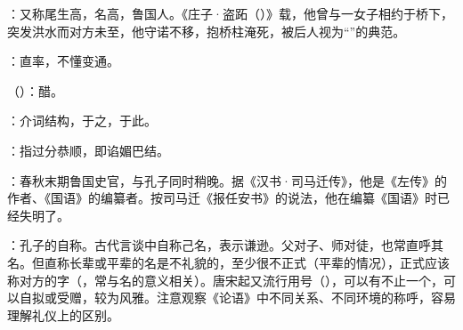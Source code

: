 {
\item {}：又称尾生高，名高，鲁国人。《庄子·盗跖（）》载，他曾与一女子相约于桥下，突发洪水而对方未至，他守诺不移，抱桥柱淹死，被后人视为“”的典范。
\item {}：直率，不懂变通。
\item {}（）：醋。
\item {}：介词结构，于之，于此。
}
{}  %


{
\item {}：指过分恭顺，即谄媚巴结。
\item {}：春秋末期鲁国史官，与孔子同时稍晚。据《汉书·司马迁传》，他是《左传》的作者、《国语》的编纂者。按司马迁《报任安书》的说法，他在编纂《国语》时已经失明了。%

\item {}：孔子的自称。古代言谈中自称己名，表示谦逊。父对子、师对徒，也常直呼其名。但直称长辈或平辈的名是不礼貌的，至少很不正式（平辈的情况），正式应该称对方的字（，常与名的意义相关）。唐宋起又流行用号（），可以有不止一个，可以自拟或受赠，较为风雅。注意观察《论语》中不同关系、不同环境的称呼，容易理解礼仪上的区别。
}
{}


